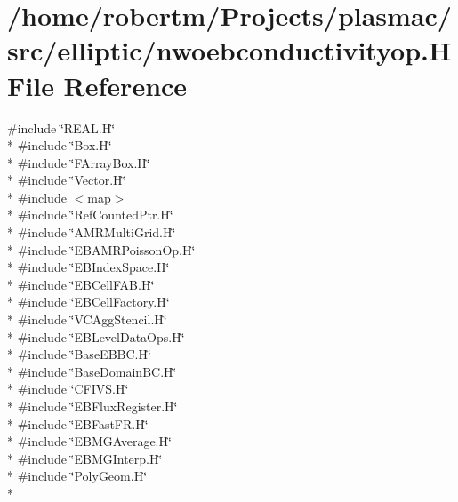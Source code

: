 \hypertarget{nwoebconductivityop_8H}{}\section{/home/robertm/\+Projects/plasmac/src/elliptic/nwoebconductivityop.H File Reference}
\label{nwoebconductivityop_8H}
{\ttfamily \#include \char`\"{}R\+E\+A\+L.\+H\char`\"{}}\\*
{\ttfamily \#include \char`\"{}Box.\+H\char`\"{}}\\*
{\ttfamily \#include \char`\"{}F\+Array\+Box.\+H\char`\"{}}\\*
{\ttfamily \#include \char`\"{}Vector.\+H\char`\"{}}\\*
{\ttfamily \#include $<$map$>$}\\*
{\ttfamily \#include \char`\"{}Ref\+Counted\+Ptr.\+H\char`\"{}}\\*
{\ttfamily \#include \char`\"{}A\+M\+R\+Multi\+Grid.\+H\char`\"{}}\\*
{\ttfamily \#include \char`\"{}E\+B\+A\+M\+R\+Poisson\+Op.\+H\char`\"{}}\\*
{\ttfamily \#include \char`\"{}E\+B\+Index\+Space.\+H\char`\"{}}\\*
{\ttfamily \#include \char`\"{}E\+B\+Cell\+F\+A\+B.\+H\char`\"{}}\\*
{\ttfamily \#include \char`\"{}E\+B\+Cell\+Factory.\+H\char`\"{}}\\*
{\ttfamily \#include \char`\"{}V\+C\+Agg\+Stencil.\+H\char`\"{}}\\*
{\ttfamily \#include \char`\"{}E\+B\+Level\+Data\+Ops.\+H\char`\"{}}\\*
{\ttfamily \#include \char`\"{}Base\+E\+B\+B\+C.\+H\char`\"{}}\\*
{\ttfamily \#include \char`\"{}Base\+Domain\+B\+C.\+H\char`\"{}}\\*
{\ttfamily \#include \char`\"{}C\+F\+I\+V\+S.\+H\char`\"{}}\\*
{\ttfamily \#include \char`\"{}E\+B\+Flux\+Register.\+H\char`\"{}}\\*
{\ttfamily \#include \char`\"{}E\+B\+Fast\+F\+R.\+H\char`\"{}}\\*
{\ttfamily \#include \char`\"{}E\+B\+M\+G\+Average.\+H\char`\"{}}\\*
{\ttfamily \#include \char`\"{}E\+B\+M\+G\+Interp.\+H\char`\"{}}\\*
{\ttfamily \#include \char`\"{}Poly\+Geom.\+H\char`\"{}}\\*
